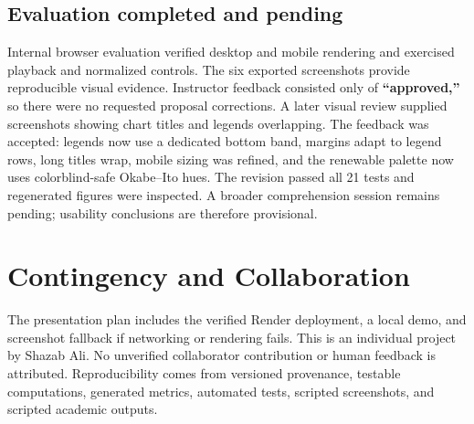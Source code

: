\documentclass[11pt]{article}
\begin{document}
\subsection{Evaluation completed and pending}
Internal browser evaluation verified desktop and mobile rendering and exercised playback and normalized controls. The six exported screenshots provide reproducible visual evidence. Instructor feedback consisted only of \textbf{``approved,''} so there were no requested proposal corrections. A later visual review supplied screenshots showing chart titles and legends overlapping. The feedback was accepted: legends now use a dedicated bottom band, margins adapt to legend rows, long titles wrap, mobile sizing was refined, and the renewable palette now uses colorblind-safe Okabe--Ito hues. The revision passed all 21 tests and regenerated figures were inspected. A broader comprehension session remains pending; usability conclusions are therefore provisional.

\section{Contingency and Collaboration}
The presentation plan includes the verified Render deployment, a local demo, and screenshot fallback if networking or rendering fails. This is an individual project by Shazab Ali. No unverified collaborator contribution or human feedback is attributed. Reproducibility comes from versioned provenance, testable computations, generated metrics, automated tests, scripted screenshots, and scripted academic outputs.
\end{document}
